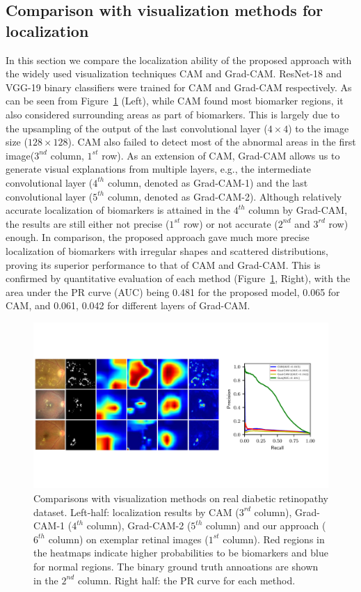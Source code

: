 \documentclass[runningheads]{llncs}
\begin{document}
\subsection{Comparison with visualization methods for localization}
In this section we compare the localization ability of the proposed approach with the widely used visualization techniques CAM and Grad-CAM. ResNet-18 and VGG-19 binary classifiers were trained for CAM and Grad-CAM respectively.  As can be seen from Figure~\ref{fig:visual} (Left), while CAM found most biomarker regions, it also considered surrounding areas as part of biomarkers. This is largely due to the upsampling of the output of the last convolutional layer ($4\times 4$) to the image size ($128\times 128$). CAM also failed to detect most of the abnormal areas in the first image($3^{nd}$ column, $1^{st}$ row). As an extension of CAM,  Grad-CAM allows us to generate visual explanations from multiple layers, e.g., the intermediate convolutional layer ($4^{th}$ column, denoted as Grad-CAM-1) and the last convolutional layer ($5^{th}$ column, denoted as Grad-CAM-2). Although relatively accurate localization of biomarkers is attained in the $4^{th}$ column by Grad-CAM, the results are still either not precise ($1^{st}$ row) or not accurate ($2^{nd}$ and $3^{rd}$ row) enough. In comparison, the proposed approach gave much more precise localization of biomarkers with irregular shapes and scattered distributions, proving its superior performance to that of CAM and Grad-CAM. This is confirmed by  quantitative evaluation of each method (Figure~\ref{fig:visual}, Right), with the area under the PR curve (AUC) being 0.481 for the proposed model, 0.065 for CAM, and 0.061, 0.042 for different layers of Grad-CAM.


\begin{figure}%
\centering 
\vspace{-0.5cm}
\includegraphics[width=0.95\linewidth]{images/retinal_image_pr.pdf}  
\caption{Comparisons with visualization methods on real diabetic retinopathy dataset. Left-half: localization results by CAM ($3^{rd}$ column), Grad-CAM-1 ($4^{th}$ column), Grad-CAM-2 ($5^{th}$ column) and our approach ($6^{th}$ column) on exemplar retinal images ($1^{st}$ column). Red regions in the heatmaps indicate higher probabilities to be biomarkers and blue for normal regions. The binary ground truth annoations are shown in the $2^{nd}$ column. Right half: the PR curve for each method. }\label{fig:visual} 
\vspace{-0.5 cm}
\end{figure}
\end{document}

